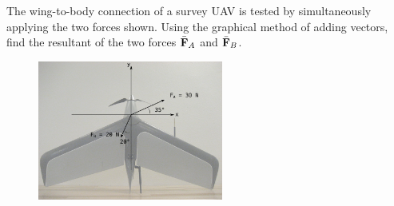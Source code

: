 
The wing-to-body connection of a survey UAV is tested by simultaneously applying the two forces shown.  Using the graphical method of adding vectors, find the resultant of the two forces $\bar{\bf F}_A$ and $\bar{\bf F}_B$.

\begin{figure}[ht!]
  \centering
  \includegraphics[height=1.8in]{2016-aem-uav-topview.png}
\end{figure}

